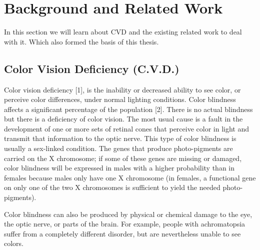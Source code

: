 \chapter{Background and Related Work}
\thispagestyle{plain}

\label{Background and Related Work}

In this section we will learn about CVD and the existing related work to deal with it. Which also formed the basis of this thesis.

\section{Color Vision Deficiency (C.V.D.)}
\label{Color Vision Deficiency}


Color vision deficiency [1], is the inability or decreased ability to see color, or perceive color differences, under normal lighting conditions. Color blindness affects a significant percentage of the population [2].  There is no actual blindness but there is a deficiency of color vision. The most usual cause is a fault in the development of one or more sets of retinal cones that perceive color in light and transmit that information to the optic nerve. This type of color blindness is usually a sex-linked condition. The genes that produce photo-pigments are carried on the X chromosome; if some of these genes are missing or damaged, color blindness will be expressed in males with a higher probability than in females because males only have one X chromosome (in females, a functional gene on only one of the two X chromosomes is sufficient to yield the needed photo-pigments).

Color blindness can also be produced by physical or chemical damage to the eye, the optic nerve, or parts of the brain. For example, people with achromatopsia suffer from a completely different disorder, but are nevertheless unable to see colors.


